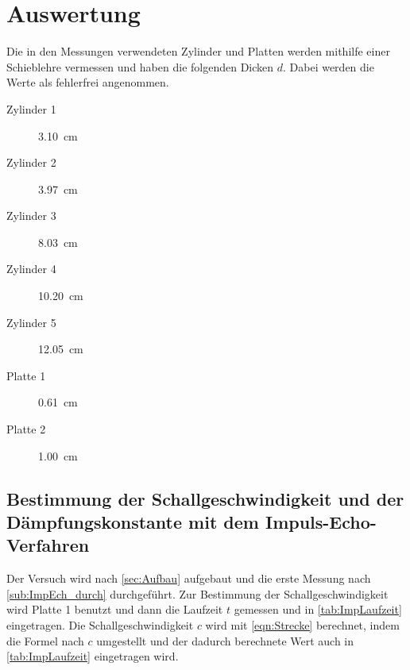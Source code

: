 \section{Auswertung}
\label{sec:Auswertung}

Die in den Messungen verwendeten Zylinder und Platten werden mithilfe einer Schieblehre vermessen und haben die folgenden Dicken $d$.
Dabei werden die Werte als fehlerfrei angenommen.
\begin{description}
  \item[Zylinder 1] \SI{3.10}{\centi\meter}
  \item[Zylinder 2] \SI{3.97}{\centi\meter}
  \item[Zylinder 3] \SI{8.03}{\centi\meter}
  \item[Zylinder 4] \SI{10.20}{\centi\meter}
  \item[Zylinder 5] \SI{12.05}{\centi\meter}
  \item[Platte 1] \SI{0.61}{\centi\meter}
  \item[Platte 2] \SI{1.00}{\centi\meter}
\end{description}

\subsection{Bestimmung der Schallgeschwindigkeit und der Dämpfungskonstante mit dem Impuls-Echo-Verfahren}
\label{sub:ImpEch}
Der Versuch wird nach \autoref{sec:Aufbau} aufgebaut und die erste Messung nach \autoref{sub:ImpEch_durch} durchgeführt.
Zur Bestimmung der Schallgeschwindigkeit wird Platte 1 benutzt und dann die Laufzeit $t$ gemessen und in \autoref{tab:ImpLaufzeit} eingetragen.
Die Schallgeschwindigkeit $c$ wird mit \autoref{eqn:Strecke} berechnet, indem die Formel nach $c$ umgestellt und der dadurch berechnete Wert auch in \autoref{tab:ImpLaufzeit} 
eingetragen wird.

